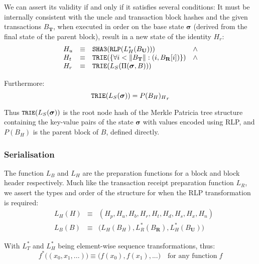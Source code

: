 \documentclass[9pt,oneside]{amsart}
\begin{document}
\begin{multicols}{2}
We can assert its validity if and only if it satisfies several conditions: It must be internally consistent with the uncle and transaction block hashes and the given transactions $B_\mathbf{T}$, when executed in order on the base state $\boldsymbol{\sigma}$ (derived from the final state of the parent block), result in a new state of the identity $H_r$:
\begin{equation}
\begin{array}[t]{lclc}
H_u &\equiv& \mathtt{\small SHA3}(\mathtt{\small RLP}(L_H^*(B_\mathbf{U}))) & \wedge \\
H_t &\equiv& \mathtt{\small TRIE}(\{\forall i < \lVert B_\mathbf{T} \rVert: (i, B_\mathbf{R}[i])\}) & \wedge \\
H_r &\equiv& \mathtt{\small TRIE}(L_S(\Pi(\boldsymbol{\sigma}, B))) &
\end{array}
\end{equation}

Furthermore:
\begin{equation}
\mathtt{\small TRIE}(L_S(\boldsymbol{\sigma})) = {P(B_H)_H}_r
\end{equation}

Thus $\texttt{\small TRIE}(L_S(\boldsymbol{\sigma}))$ is the root node hash of the Merkle Patricia tree structure containing the key-value pairs of the state $\boldsymbol{\sigma}$ with values encoded using RLP, and $P(B_H)$ is the parent block of $B$, defined directly.

\subsubsection{Serialisation}

The function $L_B$ and $L_H$ are the preparation functions for a block and block header respectively. Much like the transaction receipt preparation function $L_R$, we assert the types and order of the structure for when the RLP transformation is required:
\begin{eqnarray}
\quad L_H(H) & \equiv & (H_p, H_u, H_b, H_r, H_t, H_d, H_s, H_x, H_n) \\
\quad L_B(B) & \equiv & \big( L_H(B_H), L_R^*(B_\mathbf{R}), L_H^*(B_\mathbf{U}) \big)
\end{eqnarray}

With $L_T^*$ and $L_H^*$ being element-wise sequence transformations, thus:
\begin{equation}
f^*\big( (x_0, x_1, ...) \big) \equiv \big( f(x_0), f(x_1), ... \big) \quad \text{for any function} \; f
\end{equation}


\end{multicols}
\end{document}
